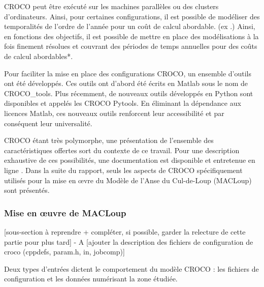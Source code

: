 \documentclass[10pt,a4paper,titlepage]{article}
\begin{document}
CROCO peut être exécuté sur les machines parallèles ou des clusters d'ordinateurs.
Ainsi, pour certaines configurations, il est possible de modéliser des temporalités de l'ordre de l'année pour un coût de calcul abordable. (ex .)
Ainsi, en fonctions des objectifs, il est possible de mettre en place des modélisations à la fois finement résolues et couvrant des périodes de temps annuelles pour des coûts de calcul abordables*.


Pour faciliter la mise en place des configurations CROCO, un ensemble d'outils ont été développés.
Ces outils ont d'abord été écrits en Matlab sous le nom de CROCO\_tools.
Plus récemment, de nouveaux outils développés en Python sont disponibles et appelés les CROCO Pytools.
En éliminant la dépendance aux licences Matlab, ces nouveaux outils renforcent leur accessibilité et par conséquent leur universalité.

CROCO étant très polymorphe, une présentation de l'ensemble des caractéristiques offertes sort du contexte de ce travail.
Pour une description exhaustive de ces possibilités, une documentation est disponible et entretenue en ligne \cite{documentation_croco}.
Dans la suite du rapport, seuls les aspects de CROCO spécifiquement utilisés pour la mise en \oe{}vre du Modèle de l'Anse du Cul-de-Loup (MACLoup) sont présentés.


\subsubsection{Mise en \oe{}uvre de MACLoup}
\label{subsub:presentation_generale}
[sous-section à reprendre + compléter, si possible, garder la relecture de cette partie pour plus tard] - A
[ajouter la description des fichiers de configuration de croco (cppdefs, param.h, in, jobcomp)]

Deux types d'entrées dictent le comportement du modèle CROCO : les fichiers de configuration et les données numérisant la zone étudiée.
\end{document}
